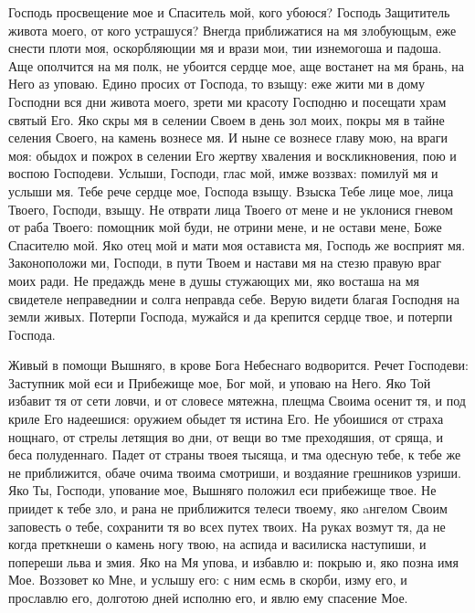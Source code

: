 \begin{mymulticols}


Господь просвещение мое и Спаситель мой, кого убоюся? Господь Защититель живота моего, от кого устрашуся? Внегда приближатися на мя злобующым, еже снести плоти моя, оскорбляющии мя и врази мои, тии изнемогоша и падоша. Аще ополчится на мя полк, не убоится сердце мое, аще востанет на мя брань, на Него аз уповаю. Едино просих от Господа, то взыщу: еже жити ми в дому Господни вся дни живота моего, зрети ми красоту Господню и посещати храм святый Его. Яко скры мя в селении Своем в день зол моих, покры мя в тайне селения Своего, на камень вознесе мя. И ныне се вознесе главу мою, на враги моя: обыдох и пожрох в селении Его жертву хваления и воскликновения, пою и воспою Господеви. Услыши, Господи, глас мой, имже воззвах: помилуй мя и услыши мя. Тебе рече сердце мое, Господа взыщу. Взыска Тебе лице мое, лица Твоего, Господи, взыщу. Не отврати лица Твоего от мене и не уклонися гневом от раба Твоего: помощник мой буди, не отрини мене, и не остави мене, Боже Спасителю мой. Яко отец мой и мати моя остависта мя, Господь же восприят мя. Законоположи ми, Господи, в пути Твоем и настави мя на стезю правую враг моих ради. Не предаждь мене в душы стужающих ми, яко восташа на мя свидетеле неправеднии и солга неправда себе. Верую видети благая Господня на земли живых. Потерпи Господа, мужайся и да крепится сердце твое, и потерпи Господа.




Живый в помощи Вышняго, в крове Бога Небеснаго водворится. Речет Господеви: Заступник мой еси и Прибежище мое, Бог мой, и уповаю на Него. Яко Той избавит тя от сети ловчи, и от словесе мятежна, плещма Своима осенит тя, и под криле Его надеешися: оружием обыдет тя истина Его. Не убоишися от страха нощнаго, от стрелы летящия во дни, от вещи во тме преходяшия, от сряща, и беса полуденнаго. Падет от страны твоея тысяща, и тма одесную тебе, к тебе же не приближится, обаче очима твоима смотриши, и воздаяние грешников узриши. Яко Ты, Господи, упование мое, Вышняго положил еси прибежище твое. Не приидет к тебе зло, и рана не приближится телеси твоему, яко aнгелом Своим заповесть о тебе, сохранити тя во всех путех твоих. На руках возмут тя, да не когда преткнеши о камень ногу твою, на аспида и василиска наступиши, и попереши льва и змия. Яко на Мя упова, и избавлю и: покрыю и, яко позна имя Мое. Воззовет ко Мне, и услышу его: с ним есмь в скорби, изму его, и прославлю его, долготою дней исполню его, и явлю ему спасение Мое.





\end{mymulticols}
